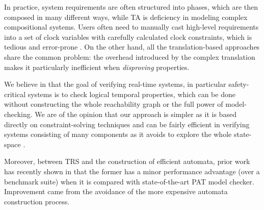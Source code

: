 \documentclass[acmsmall,10pt,review]{acmart}
\newcommand{\code}[1]{{\tt{\ensuremath{\m{#1}}}}}
\newcommand{\m}{\mathit}
\begin{document}
{{{%

In practice, system requirements are often structured into phases, which are then composed in many different ways, while TA is deficiency in modeling complex compositional systems. Users often need to manually cast high-level requirements into a set of clock variables with carefully calculated clock constraints, which is tedious and error-prone \cite{DBLP:journals/tosem/00010DLSA13}. 
On the other hand, all the translation-based approaches share the common problem: 
the overhead introduced by
the complex translation makes it particularly inefficient when \emph{disproving} properties. 

We believe in that the goal of verifying real-time systems, in particular 
safety-critical systems is to check logical temporal properties, which can 
be done without constructing the whole reachability graph or the full power 
of model-checking. We are of the opinion that our approach is simpler as 
it is based directly on constraint-solving techniques and can be fairly 
efficient in verifying systems consisting of many components as it avoids 
to explore the whole state-space \cite{DBLP:conf/icfem/SongC20,DBLP:conf/forte/YiPD94}.


 
Moreover, between TRS and the construction of efficient automata, prior work has recently shown in \cite{DBLP:conf/icfem/SongC20} that the former has a minor performance advantage (over a benchmark suite) when it is compared with state-of-the-art PAT \cite{DBLP:conf/cav/SunLDP09} model checker.
Improvement came from the avoidance of the more expensive automata construction process.



}}}
\end{document}
